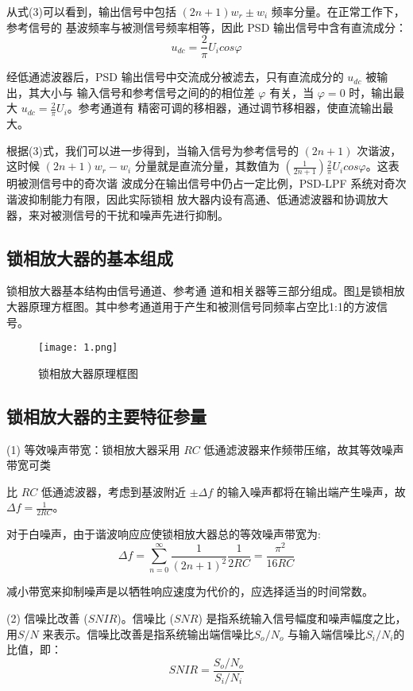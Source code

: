 \documentclass{whureport}
\begin{document}
\begin{multicols}{2}
从式(3)可以看到，输出信号中包括 $(2n + 1)w_r \pm w_i$ 频率分量。在正常工作下，参考信号的
基波频率与被测信号频率相等，因此 PSD 输出信号中含有直流成分：
\begin{equation}
    u_{dc} = \frac{2}{\pi} U_i cos\varphi
\end{equation}

经低通滤波器后，PSD 输出信号中交流成分被滤去，只有直流成分的 $u_{dc}$ 被输出，其大小与
输入信号和参考信号之间的的相位差 $\varphi$ 有关，当 $\varphi = 0$ 时，输出最大 $u_{dc} = \frac{2}{\pi} U_i$。参考通道有
精密可调的移相器，通过调节移相器，使直流输出最大。

根据(3)式，我们可以进一步得到，当输入信号为参考信号的 $(2n + 1)$ 次谐波，这时候
$(2n + 1)w_r - w_i$ 分量就是直流分量，其数值为 $(\frac{1}{2n+1}) \frac{2}{\pi} U_i cos\varphi$。这表明被测信号中的奇次谐
波成分在输出信号中仍占一定比例，PSD-LPF 系统对奇次谐波抑制能力有限，因此实际锁相
放大器内设有高通、低通滤波器和协调放大器，来对被测信号的干扰和噪声先进行抑制。
\subsection{锁相放大器的基本组成}
锁相放大器基本结构由信号通道、参考通 道和相关器等三部分组成。图\ref{LA}是锁相放大器原理方框图。其中参考通道用于产生和被测信号同频率占空比1:1的方波信号。
\begin{figure}[H]
	\centering
	\texttt{[image: 1.png]}
	\caption{锁相放大器原理框图}	
	\label{LA}
\end{figure}
\subsection{锁相放大器的主要特征参量}
(1) 等效噪声带宽：锁相放大器采用 $RC$ 低通滤波器来作频带压缩，故其等效噪声带宽可类

比 $RC$ 低通滤波器，考虑到基波附近 $\pm \Delta f$ 的输入噪声都将在输出端产生噪声，故$\Delta f = \frac{1}{2RC}$。

对于白噪声，由于谐波响应应使锁相放大器总的等效噪声带宽为:
\begin{equation}
    \Delta f = \sum_{n=0}^{\infty} \frac{1}{(2n+1)^2} \frac{1}{2RC} = \frac{\pi^2}{16RC}
\end{equation}

减小带宽来抑制噪声是以牺牲响应速度为代价的，应选择适当的时间常数。

(2) 信噪比改善 ($SNIR$)。信噪比 ($SNR$) 是指系统输入信号幅度和噪声幅度之比，用$S/N$
来表示。信噪比改善是指系统输出端信噪比$S_o / N_o$ 与输入端信噪比$S_i / N_i$的比值，即：
\begin{equation}
    SNIR = \frac{S_o / N_o}{S_i / N_i}
\end{equation}


\end{multicols}
\end{document}
